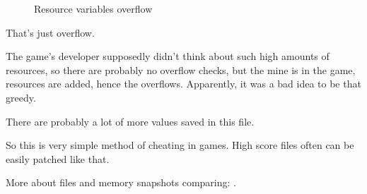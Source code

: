 \begin{figure}[H]
\centering
{}
\caption{Resource variables overflow}
\label{fig:mill_8}
\end{figure}

That's just overflow. 

The game's developer supposedly didn't think about such high amounts of resources,
so there are probably no overflow checks, but the mine is  in the game, resources are added,
hence the overflows.
Apparently, it was a bad idea to be that greedy.

There are probably a lot of more values 
saved in this file.

So this is very simple method of cheating in games.
High score files often can be easily 
patched like that.

More about files and memory snapshots comparing: 
.
